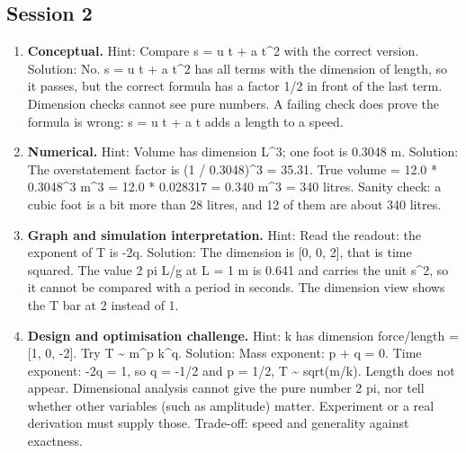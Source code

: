 \documentclass[11pt,a4paper]{article}
\begin{document}
\subsection*{Session 2}
\begin{enumerate}[nosep]
\item \textbf{Conceptual.} Hint: Compare s = u t + a t\textasciicircum{}2 with the correct version. Solution: No. s = u t + a t\textasciicircum{}2 has all terms with the dimension of length, so it passes, but the correct formula has a factor 1/2 in front of the last term. Dimension checks cannot see pure numbers. A failing check does prove the formula is wrong: s = u t + a t adds a length to a speed.
\item \textbf{Numerical.} Hint: Volume has dimension L\textasciicircum{}3; one foot is 0.3048 m. Solution: The overstatement factor is (1 / 0.3048)\textasciicircum{}3 = 35.31. True volume = 12.0 * 0.3048\textasciicircum{}3 m\textasciicircum{}3 = 12.0 * 0.028317 = 0.340 m\textasciicircum{}3 = 340 litres. Sanity check: a cubic foot is a bit more than 28 litres, and 12 of them are about 340 litres.
\item \textbf{Graph and simulation interpretation.} Hint: Read the readout: the exponent of T is -2q. Solution: The dimension is [0, 0, 2], that is time squared. The value 2 pi L/g at L = 1 m is 0.641 and carries the unit s\textasciicircum{}2, so it cannot be compared with a period in seconds. The dimension view shows the T bar at 2 instead of 1.
\item \textbf{Design and optimisation challenge.} Hint: k has dimension force/length = [1, 0, -2]. Try T \textasciitilde{} m\textasciicircum{}p k\textasciicircum{}q. Solution: Mass exponent: p + q = 0. Time exponent: -2q = 1, so q = -1/2 and p = 1/2, T \textasciitilde{} sqrt(m/k). Length does not appear. Dimensional analysis cannot give the pure number 2 pi, nor tell whether other variables (such as amplitude) matter. Experiment or a real derivation must supply those. Trade-off: speed and generality against exactness.
\end{enumerate}
\end{document}
